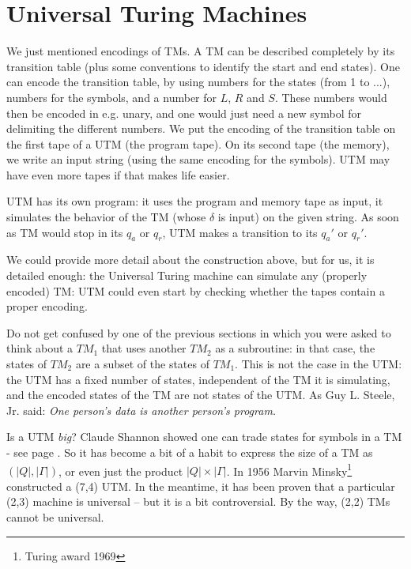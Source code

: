 \section{Universal Turing Machines}
We just mentioned encodings of TMs. A TM can be described completely by its transition table (plus some
conventions to identify the start and end states). One can encode the
transition table, by using numbers for the states (from 1 to ...),
numbers for the symbols, and a number for $L$, $R$ and $S$. These numbers
would then be encoded in e.g. unary, and one would just need a new
symbol for delimiting the different numbers. We put the encoding of
the transition table on the first tape of a UTM (the program tape). On
its second tape (the memory), we write an input string (using the same
encoding for the symbols).  UTM may have even more tapes if that makes
life easier.

UTM has its own program: it uses the program and memory tape as input,
it simulates the behavior of the TM (whose $\delta$ is input) on the
given string. As soon as TM would stop in its $q_a$ or $q_r$, UTM
makes a transition to its $q_a'$ or $q_r'$.

We could provide more detail about the construction above, but for us,
it is detailed enough: the Universal Turing machine can simulate any
(properly encoded) TM: UTM could even start by checking whether the
tapes contain a proper encoding.

Do not get confused by one of the previous sections in which you were
asked to think about a $TM_1$ that uses another $TM_2$ as a
subroutine: in that case, the states of $TM_2$ are a subset of the
states of $TM_1$. This is not the case in the UTM: the UTM has a fixed
number of states, independent of the TM it is simulating, and the
encoded states of the TM are not states of the UTM. As Guy L. Steele,
Jr. said: {\em One person's data is another person's program.}


Is a UTM {\em big}? Claude Shannon showed one can trade states for
symbols in a TM - see page \pageref{twosymbols}. So it
has become a bit of a habit to express the size of a TM as
$(|Q|,|\Gamma|)$, or even just the product $|Q| \times |\Gamma|$. In
1956 Marvin Minsky\footnote{Turing award 1969} constructed a (7,4)
UTM. In the meantime, it has been proven that a particular (2,3)
machine is universal -- but it is a bit controversial.  By the way, (2,2) TMs
cannot be universal.

